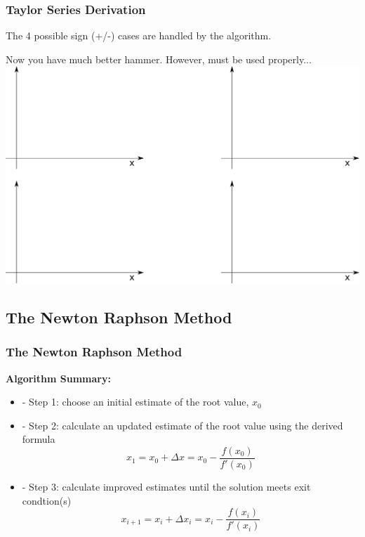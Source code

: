 \documentclass[fleqn]{beamer} %
\newcommand{\sectionIIsubsectionIItitle}{Taylor Series Derivation}
\newcommand{\sectionIIsubsectionIIItitle}{The Newton Raphson Method}
\begin{document}
			\begin{frame}
				\frametitle{\sectionIIsubsectionIItitle} \small
				\bigskip

				The 4 possible sign (+/-) cases are handled by the algorithm. 

				Now you have much better hammer. However, must be used properly... \vspace{3mm}\\
				\includegraphics[scale=.35]{images/topic3_fig2.png}

				\btVFill
			\end{frame}		


		\subsection{\sectionIIsubsectionIIItitle}\label{sectionIIsubsectionIII}

			\begin{frame}
				\frametitle{\sectionIIsubsectionIIItitle}
				\bigskip

				\textbf{Algorithm Summary:}
				\begin{itemize}
					\item - Step 1: choose an initial estimate of the root value, $x_0$  
					\item - Step 2: calculate an updated estimate of the root value using the derived formula \vspace{2mm} \\
						\[ x_{1}=x_0 + \Delta x = x_0 - \frac{f(x_0)}{f'(x_0)} \]
					\item - Step 3: calculate improved estimates until the solution meets exit condtion(s)
						\[ x_{i+1}=x_i + \Delta x_i = x_i - \frac{f(x_i)}{f'(x_i)} \]
				\end{itemize}
				\btVFill 
			\end{frame}
\end{document}
